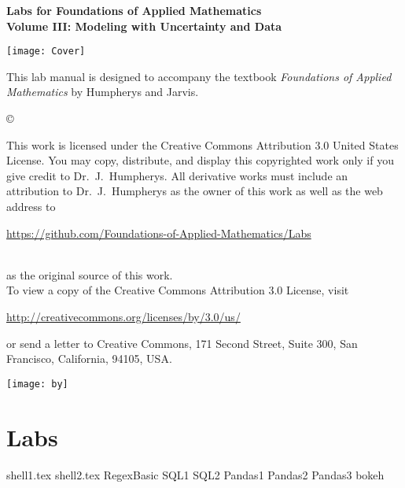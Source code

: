 \documentclass[nociteref]{SIAM-GH-book}
\begin{document}

\thispagestyle{empty} %

\begin{center}
{\huge \bf Labs for Foundations of Applied Mathematics} \\
\vspace{5mm}
{\Large \bf Volume III: Modeling with Uncertainty and Data}
\vspace{20mm}

\texttt{[image: Cover]}
\end{center}
\frontmatter



\begin{thepreface} %

This lab manual is designed to accompany the textbook \emph{Foundations of Applied Mathematics} by Humpherys and Jarvis.

\vfill
\copyright{This work is licensed under the Creative Commons Attribution 3.0 United States
License.  You may copy, distribute, and display this copyrighted work only if you give
credit to Dr.~J.~Humpherys. All derivative works must include an attribution to Dr.~J.~Humpherys as the owner of this work as well as the web address to
\\\centerline{\url{https://github.com/Foundations-of-Applied-Mathematics/Labs}}\\as the original source of this work.
\\To view a copy of the Creative Commons Attribution 3.0 License, visit
\\\centerline{\url{http://creativecommons.org/licenses/by/3.0/us/}} or send a letter to Creative Commons, 171 Second Street, Suite 300, San Francisco, California, 94105, USA.}

\vfill
\centering\texttt{[image: by]}
\vfill
\end{thepreface}

\setcounter{tocdepth}{1}
\tableofcontents

\mainmatter %

\part{Labs} %
{shell1.tex}
{shell2.tex}
{RegexBasic}
{SQL1}
{SQL2}
{Pandas1}
{Pandas2}
{Pandas3}
{bokeh}
\end{document}
